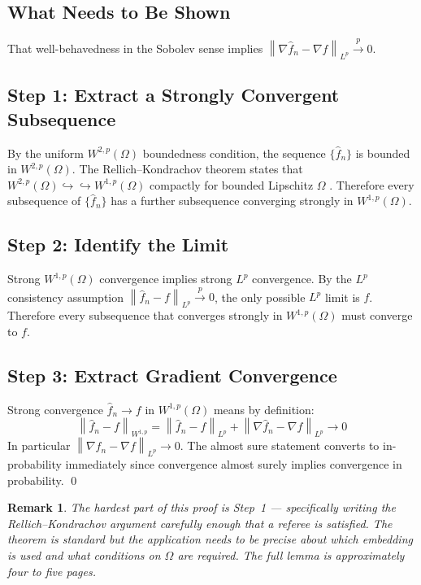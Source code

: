 \documentclass[12pt]{article}
\newtheorem{remark}{Remark}
\newcommand{\norm}[1]{\left\| #1 \right\|}
\newcommand{\Wonep}{W^{1,p}(\Omega)}
\newcommand{\Wtwop}{W^{2,p}(\Omega)}
\newcommand{\fn}{\hat{f}_n}
\newcommand{\xrightarrowp}{\xrightarrow{p}}
\begin{document}
	\subsection{What Needs to Be Shown}
	
	That well-behavedness in the Sobolev sense implies
	$\norm{\nabla \fn - \nabla f}_{L^p} \xrightarrowp 0$.
	
	\subsection{Step 1: Extract a Strongly Convergent Subsequence}
	
	By the uniform $\Wtwop$ boundedness condition, the sequence $\{\fn\}$ is
	bounded in $\Wtwop$. The Rellich--Kondrachov theorem states that
	$W^{2,p}(\Omega) \hookrightarrow\hookrightarrow W^{1,p}(\Omega)$ compactly
	for bounded Lipschitz $\Omega$ \citep[Theorem~5,~Section~5.7]{evans2010pde}.
	Therefore every subsequence of $\{\fn\}$ has a further subsequence converging
	strongly in $\Wonep$.
	
	\subsection{Step 2: Identify the Limit}
	
	Strong $\Wonep$ convergence implies strong $L^p$ convergence. By the $L^p$
	consistency assumption $\norm{\fn - f}_{L^p} \xrightarrowp 0$, the only
	possible $L^p$ limit is $f$. Therefore every subsequence that converges
	strongly in $\Wonep$ must converge to $f$.
	
	\subsection{Step 3: Extract Gradient Convergence}
	
	Strong convergence $\fn \to f$ in $\Wonep$ means by definition:
	\begin{equation}
		\norm{\fn - f}_{W^{1,p}}
		= \norm{\fn - f}_{L^p} + \norm{\nabla \fn - \nabla f}_{L^p}
		\to 0
	\end{equation}
	In particular $\norm{\nabla \fn - \nabla f}_{L^p} \to 0$. The almost sure
	statement converts to in-probability immediately since convergence almost
	surely implies convergence in probability.
	\qed
	
	\begin{remark}
		The hardest part of this proof is Step~1 --- specifically writing the
		Rellich--Kondrachov argument carefully enough that a referee is satisfied. The
		theorem is standard but the application needs to be precise about which
		embedding is used and what conditions on $\Omega$ are required. The full
		lemma is approximately four to five pages.
	\end{remark}
	
\end{document}
